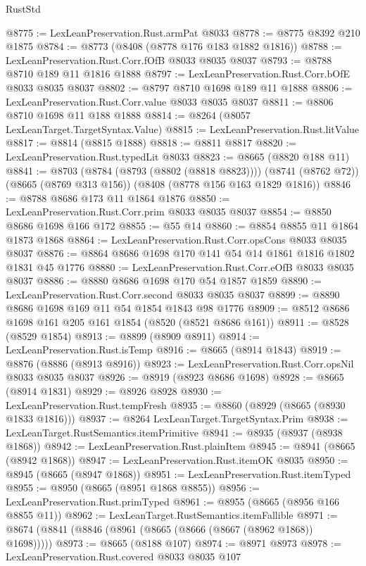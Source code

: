\begin{lexlean}{RustStd}
\begin{coremodule}
{\begin{coremodule}
{{{{{{{{{{{{{{{{{{{{{{{{{{{{{{{{{{{{{{{{{{{{{{{@8775 := LexLeanPreservation.Rust.armPat @8033
@8778 := @8775 @8392 @210 @1875
@8784 := @8773 (@8408 (@8778 @176 @183 @1882 @1816))
@8788 := LexLeanPreservation.Rust.Corr.fOfB @8033 @8035 @8037
@8793 := @8788 @8710 @189 @11 @1816 @1888
@8797 := LexLeanPreservation.Rust.Corr.bOfE @8033 @8035 @8037
@8802 := @8797 @8710 @1698 @189 @11 @1888
@8806 := LexLeanPreservation.Rust.Corr.value @8033 @8035 @8037
@8811 := @8806 @8710 @1698 @11 @188 @1888
@8814 := @8264 (@8057 LexLeanTarget.TargetSyntax.Value)
@8815 := LexLeanPreservation.Rust.litValue
@8817 := @8814 (@8815 @1888)
@8818 := @8811 @8817
@8820 := LexLeanPreservation.Rust.typedLit @8033
@8823 := @8665 (@8820 @188 @11)
@8841 := @8703
    (@8784 (@8793 (@8802 (@8818 @8823))))
    (@8741 (@8762 @72))
    (@8665 (@8769 @313 @156))
    (@8408 (@8778 @156 @163 @1829 @1816))
@8846 := @8788 @8686 @173 @11 @1864 @1876
@8850 := LexLeanPreservation.Rust.Corr.prim @8033 @8035 @8037
@8854 := @8850 @8686 @1698 @166 @172
@8855 := @55 @14
@8860 := @8854 @8855 @11 @1864 @1873 @1868
@8864 := LexLeanPreservation.Rust.Corr.opsCons @8033 @8035 @8037
@8876 := @8864 @8686 @1698 @170 @141 @54 @14 @1861 @1816 @1802 @1831 @45 @1776
@8880 := LexLeanPreservation.Rust.Corr.eOfB @8033 @8035 @8037
@8886 := @8880 @8686 @1698 @170 @54 @1857 @1859
@8890 := LexLeanPreservation.Rust.Corr.second @8033 @8035 @8037
@8899 := @8890 @8686 @1698 @169 @11 @54 @1854 @1843 @98 @1776
@8909 := @8512 @8686 @1698 @161 @205 @161 @1854 (@8520 (@8521 @8686 @161))
@8911 := @8528 (@8529 @1854)
@8913 := @8899 (@8909 @8911)
@8914 := LexLeanPreservation.Rust.isTemp
@8916 := @8665 (@8914 @1843)
@8919 := @8876 (@8886 (@8913 @8916))
@8923 := LexLeanPreservation.Rust.Corr.opsNil @8033 @8035 @8037
@8926 := @8919 (@8923 @8686 @1698)
@8928 := @8665 (@8914 @1831)
@8929 := @8926 @8928
@8930 := LexLeanPreservation.Rust.tempFresh
@8935 := @8860 (@8929 (@8665 (@8930 @1833 @1816)))
@8937 := @8264 LexLeanTarget.TargetSyntax.Prim
@8938 := LexLeanTarget.RustSemantics.itemPrimitive
@8941 := @8935 (@8937 (@8938 @1868))
@8942 := LexLeanPreservation.Rust.plainItem
@8945 := @8941 (@8665 (@8942 @1868))
@8947 := LexLeanPreservation.Rust.itemOK @8035
@8950 := @8945 (@8665 (@8947 @1868))
@8951 := LexLeanPreservation.Rust.itemTyped
@8955 := @8950 (@8665 (@8951 @1868 @8855))
@8956 := LexLeanPreservation.Rust.primTyped
@8961 := @8955 (@8665 (@8956 @166 @8855 @11))
@8962 := LexLeanTarget.RustSemantics.itemFallible
@8971 := @8674 (@8841 (@8846 (@8961 (@8665 (@8666 (@8667 (@8962 @1868)) @1698)))))
@8973 := @8665 (@8188 @107)
@8974 := @8971 @8973
@8978 := LexLeanPreservation.Rust.covered @8033 @8035 @107
}}}}}}}}}}}}}}}}}}}}}}}}}}}}}}}}}}}}}}}}}}}}}}}
\end{coremodule}}
\end{coremodule}
\end{lexlean}
